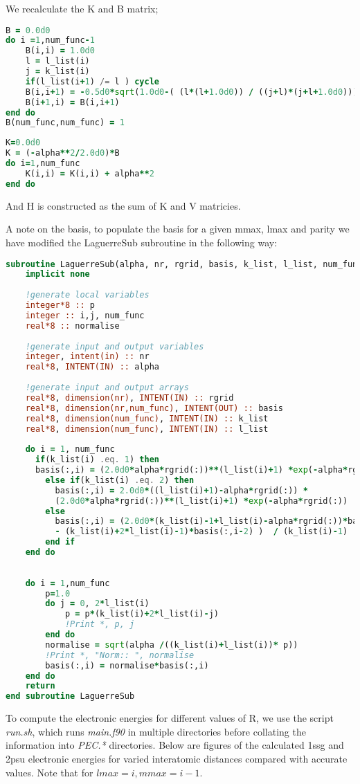 \documentclass{article}
\begin{document}
We recalculate the K and B matrix;

\begin{lstlisting}[language=fortran]
B = 0.0d0
do i =1,num_func-1
	B(i,i) = 1.0d0
	l = l_list(i)
	j = k_list(i)
	if(l_list(i+1) /= l ) cycle
	B(i,i+1) = -0.5d0*sqrt(1.0d0-( (l*(l+1.0d0)) / ((j+l)*(j+l+1.0d0))))
	B(i+1,i) = B(i,i+1)
end do
B(num_func,num_func) = 1
\end{lstlisting}
\begin{lstlisting}[language=fortran]
K=0.0d0
K = (-alpha**2/2.0d0)*B
do i=1,num_func
	K(i,i) = K(i,i) + alpha**2
end do
\end{lstlisting}

And H is constructed as the sum of K and V matricies.

A note on the basis, to populate the basis for a given mmax, lmax and parity we have modified the LaguerreSub subroutine in the following way:

\begin{lstlisting}[language=fortran]
subroutine LaguerreSub(alpha, nr, rgrid, basis, k_list, l_list, num_func)
	implicit none
	
	!generate local variables
	integer*8 :: p
	integer :: i,j, num_func
	real*8 :: normalise
	
	!generate input and output variables
	integer, intent(in) :: nr    
	real*8, INTENT(IN) :: alpha
	
	!generate input and output arrays
	real*8, dimension(nr), INTENT(IN) :: rgrid
	real*8, dimension(nr,num_func), INTENT(OUT) :: basis
	real*8, dimension(num_func), INTENT(IN) :: k_list
	real*8, dimension(num_func), INTENT(IN) :: l_list
	
	do i = 1, num_func
	  if(k_list(i) .eq. 1) then
	  basis(:,i) = (2.0d0*alpha*rgrid(:))**(l_list(i)+1) *exp(-alpha*rgrid(:))
		else if(k_list(i) .eq. 2) then
	      basis(:,i) = 2.0d0*((l_list(i)+1)-alpha*rgrid(:)) * 
		  (2.0d0*alpha*rgrid(:))**(l_list(i)+1) *exp(-alpha*rgrid(:))
		else
		  basis(:,i) = (2.0d0*(k_list(i)-1+l_list(i)-alpha*rgrid(:))*basis(:,i-1) 
		  - (k_list(i)+2*l_list(i)-1)*basis(:,i-2) )  / (k_list(i)-1)
		end if
	end do
	
	
	do i = 1,num_func
		p=1.0
		do j = 0, 2*l_list(i)
			p = p*(k_list(i)+2*l_list(i)-j)
			!Print *, p, j
		end do
		normalise = sqrt(alpha /((k_list(i)+l_list(i))* p))
		!Print *, "Norm:: ", normalise
		basis(:,i) = normalise*basis(:,i)
	end do
	return
end subroutine LaguerreSub
\end{lstlisting}

To compute the electronic energies for different values of R, we use the script \textit{run.sh}, which runs \textit{main.f90} in multiple directories before collating the information into \textit{PEC.*} directories. Below are figures of the calculated 1ssg and 2psu electronic energies for varied interatomic distances compared with accurate values. Note that for $lmax = i, mmax=i-1$. 
\end{document}
